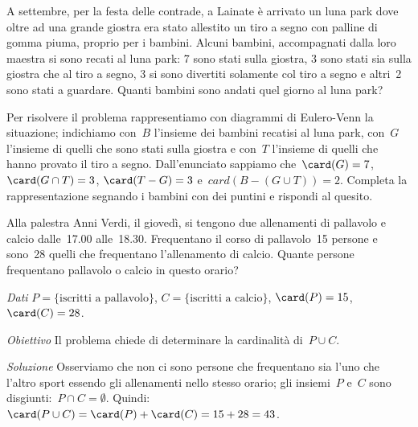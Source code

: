 {\begin{esempio}
 \end{esempio}

 \begin{esempio}
 A settembre, per la festa delle contrade, a Lainate è arrivato un luna
park dove oltre ad una grande giostra era stato allestito un tiro a
segno con palline di gomma piuma, proprio per i bambini. Alcuni
bambini, accompagnati dalla loro maestra si sono recati al luna park: 7
sono stati sulla giostra, 3 sono stati sia sulla giostra che al tiro a
segno, 3 si sono divertiti solamente col tiro a segno e altri~2 sono
stati a guardare. Quanti bambini sono andati quel giorno al luna park?

\begin{minipage}{.59 \textwidth}
Per risolvere il problema rappresentiamo con diagrammi di Eulero-Venn la 
situazione; indichiamo con~$B$ l'insieme dei bambini recatisi al luna park, 
con~$G$ l'insieme di quelli che sono stati sulla giostra e con~$T$ l'insieme
di quelli che hanno provato il tiro a segno.
Dall'enunciato sappiamo 
che~$\card(G)=7$, $\card(G\cap T)=3$, $\card(T-G)=3$ e~$card(B-(G\cup T))=2$.
Completa la rappresentazione segnando i bambini con dei puntini e rispondi 
al quesito.
\end{minipage}
\hfill
\begin{minipage}{.39 \textwidth}
\begin{center}
 
\end{center}
\end{minipage}

\end{esempio}

\begin{esempio}
Alla palestra Anni Verdi, il giovedì, si tengono due allenamenti di pallavolo 
e calcio dalle~17.00 alle~18.30. Frequentano il corso di
pallavolo~15 persone e sono~28 quelli che frequentano l'allenamento di calcio. 
Quante persone frequentano pallavolo o calcio in questo orario?

\emph{Dati} $P=\{\text{iscritti a pallavolo}\}$, $C=\{\text{iscritti a 
calcio}\}$, $\card(P)=15$, $\card(C)=28$.

\emph{Obiettivo} Il problema chiede di determinare la cardinalità 
di~$P\cup C$.

\emph{Soluzione} Osserviamo che non ci sono persone che frequentano sia
l'uno che l'altro sport essendo gli allenamenti nello stesso orario; gli 
insiemi~$P$ e~$C$ sono disgiunti:~$P\cap C=\emptyset $. 
Quindi:~$\card(P\cup C)=\card(P)+\card(C)=15+28=43$.
\end{esempio}

}
